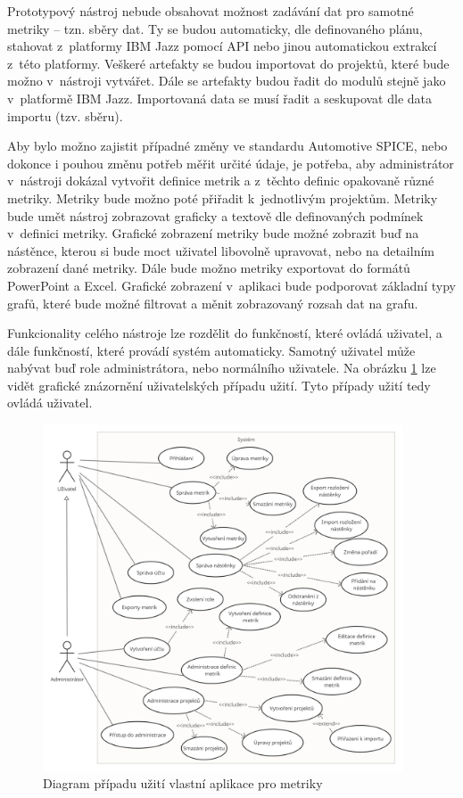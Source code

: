 \documentclass[czech,master]{diploma}
\begin{document}
Prototypový nástroj nebude obsahovat možnost zadávání dat pro samotné metriky -- tzn. sběry dat. Ty se budou automaticky, dle definovaného plánu, stahovat z~platformy IBM Jazz pomocí API nebo jinou automatickou extrakcí z~této platformy. Veškeré artefakty se budou importovat do projektů, které bude možno v~nástroji vytvářet. Dále se artefakty budou řadit do modulů stejně jako v~platformě IBM Jazz. Importovaná data se musí řadit a seskupovat dle data importu (tzv. sběru).

Aby bylo možno zajistit případné změny ve standardu Automotive SPICE, nebo dokonce i pouhou změnu potřeb měřit určité údaje, je potřeba, aby administrátor v~nástroji dokázal vytvořit definice metrik a z~těchto definic opakovaně různé metriky. Metriky bude možno poté přiřadit k~jednotlivým projektům. Metriky bude umět nástroj zobrazovat graficky a textově dle definovaných podmínek v~definici metriky. Grafické zobrazení metriky bude možné zobrazit buď na nástěnce, kterou si bude moct uživatel libovolně upravovat, nebo na detailním zobrazení dané metriky. Dále bude možno metriky exportovat do formátů PowerPoint a Excel. Grafické zobrazení v~aplikaci bude podporovat základní typy grafů, které bude možné filtrovat a měnit zobrazovaný rozsah dat na grafu.

Funkcionality celého nástroje lze rozdělit do funkčností, které ovládá uživatel, a dále funkčností, které provádí systém automaticky. Samotný uživatel může nabývat buď role administrátora, nebo normálního uživatele. Na obrázku \ref{fig:jazz_metrics_use_case} lze vidět grafické znázornění uživatelských případu užití. Tyto případy užití tedy ovládá uživatel.

\begin{figure}[!ht]
    \centering
    \includegraphics[width=0.95\textwidth]{Diplomka/Figures/use_case_jazz.png}
    \caption{Diagram případu užití vlastní aplikace pro metriky}
    \label{fig:jazz_metrics_use_case}
\end{figure}
\end{document}
